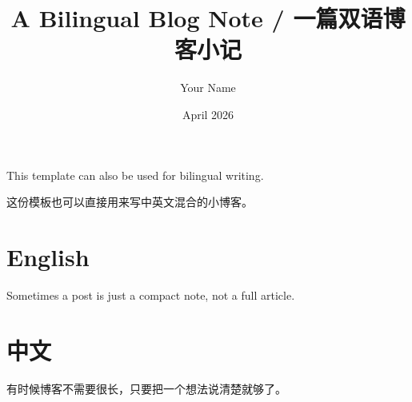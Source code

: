 \documentclass[12pt]{article}
\title{A Bilingual Blog Note / 一篇双语博客小记}
\author{Your Name}
\date{April 2026}
\begin{document}
\maketitle

This template can also be used for bilingual writing.

这份模板也可以直接用来写中英文混合的小博客。

\section*{English}
Sometimes a post is just a compact note, not a full article.

\section*{中文}
有时候博客不需要很长，只要把一个想法说清楚就够了。
\end{document}

